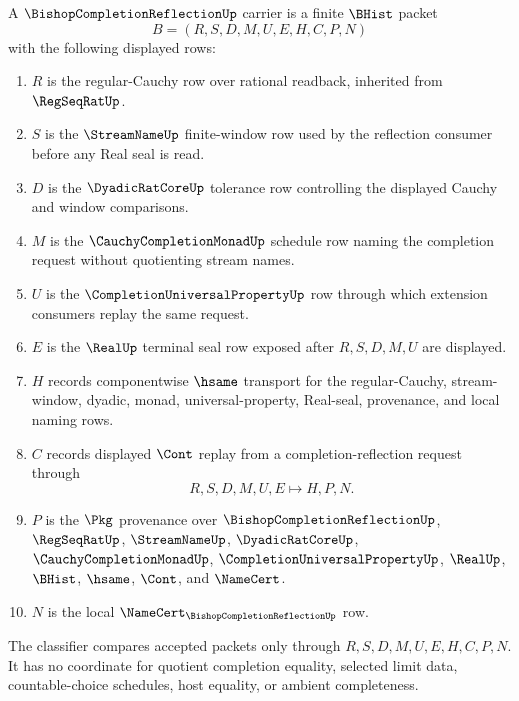 \begin{definition}
\label{def:bishop-completion-reflection-carrier}
A $\BishopCompletionReflectionUp$ carrier is a finite $\BHist$ packet
$$
B=(R,S,D,M,U,E,H,C,P,N)
$$
with the following displayed rows:
\begin{enumerate}
\item $R$ is the regular-Cauchy row over rational readback, inherited from $\RegSeqRatUp$.
\item $S$ is the $\StreamNameUp$ finite-window row used by the reflection consumer before any Real seal is read.
\item $D$ is the $\DyadicRatCoreUp$ tolerance row controlling the displayed Cauchy and window comparisons.
\item $M$ is the $\CauchyCompletionMonadUp$ schedule row naming the completion request without quotienting stream names.
\item $U$ is the $\CompletionUniversalPropertyUp$ row through which extension consumers replay the same request.
\item $E$ is the $\RealUp$ terminal seal row exposed after $R,S,D,M,U$ are displayed.
\item $H$ records componentwise $\hsame$ transport for the regular-Cauchy, stream-window, dyadic, monad, universal-property, Real-seal, provenance, and local naming rows.
\item $C$ records displayed $\Cont$ replay from a completion-reflection request through
$$
R,S,D,M,U,E \longmapsto H,P,N .
$$
\item $P$ is the $\Pkg$ provenance over $\BishopCompletionReflectionUp$, $\RegSeqRatUp$, $\StreamNameUp$, $\DyadicRatCoreUp$, $\CauchyCompletionMonadUp$, $\CompletionUniversalPropertyUp$, $\RealUp$, $\BHist$, $\hsame$, $\Cont$, and $\NameCert$.
\item $N$ is the local $\NameCert_{\BishopCompletionReflectionUp}$ row.
\end{enumerate}
The classifier compares accepted packets only through $R,S,D,M,U,E,H,C,P,N$. It has no coordinate for quotient completion equality, selected limit data, countable-choice schedules, host equality, or ambient completeness.
\end{definition}

